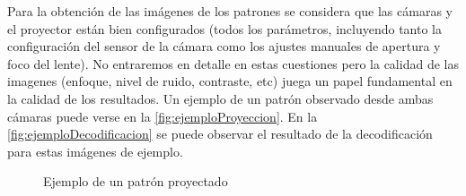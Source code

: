Para la obtención de las imágenes de los patrones se considera que las cámaras y el proyector están bien configurados (todos los parámetros, incluyendo tanto la configuración del sensor de la cámara como los ajustes manuales de apertura y foco del lente). No entraremos en detalle en estas cuestiones pero la calidad de las imagenes (enfoque, nivel de ruido, contraste, etc) juega un papel fundamental en la calidad de los resultados.
Un ejemplo de un patrón observado desde ambas cámaras puede verse en la \autoref{fig:ejemploProyeccion}. En la \autoref{fig:ejemploDecodificacion} se puede observar el resultado de la decodificación para estas imágenes de ejemplo.

\begin{figure}[!bth]
    \myfloatalign
        \caption{Ejemplo de un patrón proyectado}
        \label{fig:ejemploProyeccion}
\end{figure}

